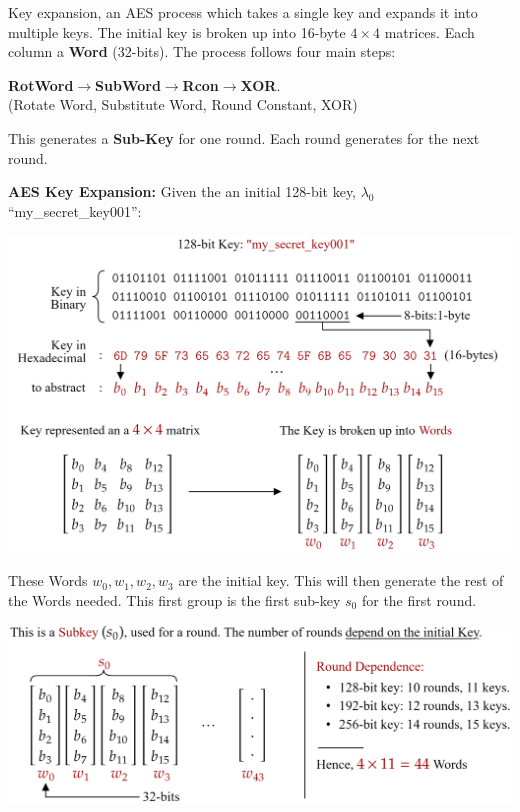 \begin{Def}
    
        \label{theo:key_expansion}
        Key expansion, an AES process which takes a single key and expands it into multiple keys. The initial key 
        is broken up into 16-byte $4\times4$ matrices. Each column a \textbf{Word} (32-bits). The process follows 
        four main steps:
        \begin{center}
            \textbf{RotWord}$\rightarrow$\textbf{SubWord}$\rightarrow$\textbf{Rcon}$\rightarrow$\textbf{XOR}.\\
            (Rotate Word, Substitute Word, Round Constant, XOR)
        \end{center}
        
        \noindent
        This generates a \textbf{Sub-Key} for one round. Each round generates for the next round.
\end{Def}

\noindent
\textbf{AES Key Expansion:} Given the an initial 128-bit key, $\lambda_0$ ``my\_secret\_key001'':\\

\vspace{1em}

\hspace{-3em}
\includegraphics [width=1.1\textwidth]{Sections/sec/enc/aes/input.png}

\vspace{3em}
\noindent
These Words $w_0, w_1, w_2, w_3$ are the initial key. This will then generate the rest of the Words needed.
This first group is the first sub-key $s_0$ for the first round.

\newpage 

\hspace{-3em}
\includegraphics[width=1.1\textwidth]{Sections/sec/enc/aes/subkey.png}

